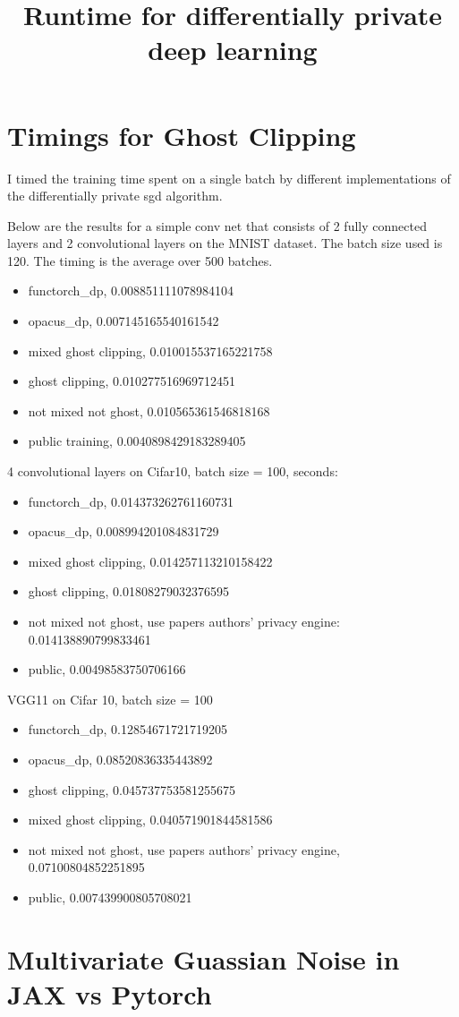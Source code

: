 \documentclass{article}
\date{}
\author{}
\title{Runtime for differentially private deep learning}
\theoremstyle{plain}
\begin{document}
\maketitle
    
\doublespacing
\section*{Timings for Ghost Clipping}
I timed the training time spent on a single batch by different implementations of the differentially private sgd algorithm.

Below are the results for a simple conv net that consists of 2 fully connected layers and 2 convolutional layers on the MNIST dataset. The batch size used is 120. The timing is the average over 500 batches.
\begin{itemize}
    \item functorch\_dp, 0.008851111078984104
    \item opacus\_dp, 0.007145165540161542
    \item mixed ghost clipping, 0.010015537165221758
    \item ghost clipping, 0.010277516969712451
    \item not mixed not ghost, 0.010565361546818168
    \item public training, 0.0040898429183289405
\end{itemize}

4 convolutional layers on Cifar10, batch size = 100, seconds:
\begin{itemize}
    \item functorch\_dp, 0.014373262761160731
    \item opacus\_dp, 0.008994201084831729
    \item mixed ghost clipping, 0.014257113210158422
    \item ghost clipping, 0.01808279032376595
    \item not mixed not ghost, use papers authors' privacy engine:  0.014138890799833461
    \item public, 0.00498583750706166
\end{itemize}

VGG11 on Cifar 10, batch size = 100
\begin{itemize}
    \item functorch\_dp, 0.12854671721719205
    \item opacus\_dp, 0.08520836335443892
    \item ghost clipping, 0.045737753581255675
    \item mixed ghost clipping, 0.040571901844581586
    \item not mixed not ghost, use papers authors' privacy engine, 0.07100804852251895
    \item public, 0.007439900805708021
\end{itemize}


\section*{Multivariate Guassian Noise in JAX vs Pytorch}
\end{document}
